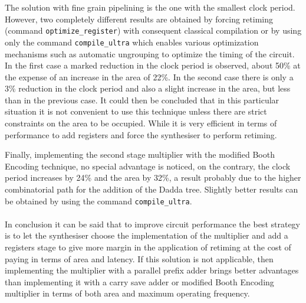 The solution with fine grain pipelining is the one with the smallest clock period. However, two completely different results are obtained by forcing retiming (command \texttt{optimize\_register}) with consequent classical compilation or by using only the command \texttt{compile\_ultra} which enables various optimization mechanisms such as automatic ungrouping to optimize the timing of the circuit. In the first case a marked reduction in the clock period is observed, about 50\% at the expense of an increase in the area of 22\%. In the second case there is only a 3\% reduction in the clock period and also a slight increase in the area, but less than in the previous case. It could then be concluded that in this particular situation it is not convenient to use this technique unless there are strict constraints on the area to be occupied. While it is very efficient in terms of performance to add registers and force the synthesiser to perform retiming.

Finally, implementing the second stage multiplier with the modified Booth Encoding technique, no special advantage is noticed, on the contrary, the clock period increases by 24\% and the area by 32\%, a result probably due to the higher combinatorial path for the addition of the Dadda tree. Slightly better results can be obtained by using the command \texttt{compile\_ultra}.
\\
\\
In conclusion it can be said that to improve circuit performance the best strategy is to let the synthesiser choose the implementation of the multiplier and add a registers stage to give more margin in the application of retiming at the cost of paying in terms of area and latency. If this solution is not applicable, then implementing the multiplier with a parallel prefix adder brings better advantages than implementing it with a carry save adder or modified Booth Encoding multiplier in terms of both area and maximum operating frequency.
